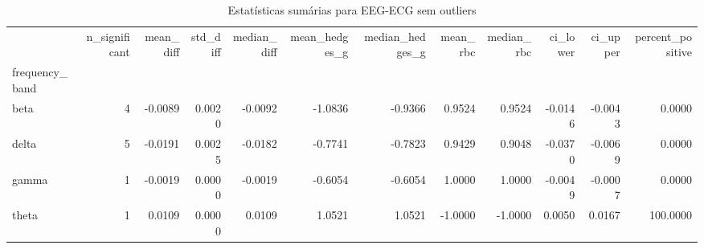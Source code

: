 \begin{table}[htbp]
\centering
\begin{tabular}{lrrrrrrrrrrr}
\toprule
 & n\_significant & mean\_diff & std\_diff & median\_diff & mean\_hedges\_g & median\_hedges\_g & mean\_rbc & median\_rbc & ci\_lower & ci\_upper & percent\_positive \\
frequency\_band &  &  &  &  &  &  &  &  &  &  &  \\
\midrule
beta & 4 & -0.0089 & 0.0020 & -0.0092 & -1.0836 & -0.9366 & 0.9524 & 0.9524 & -0.0146 & -0.0043 & 0.0000 \\
delta & 5 & -0.0191 & 0.0025 & -0.0182 & -0.7741 & -0.7823 & 0.9429 & 0.9048 & -0.0370 & -0.0069 & 0.0000 \\
gamma & 1 & -0.0019 & 0.0000 & -0.0019 & -0.6054 & -0.6054 & 1.0000 & 1.0000 & -0.0049 & -0.0007 & 0.0000 \\
theta & 1 & 0.0109 & 0.0000 & 0.0109 & 1.0521 & 1.0521 & -1.0000 & -1.0000 & 0.0050 & 0.0167 & 100.0000 \\
\bottomrule
\end{tabular}
\caption{Estatísticas sumárias para EEG-ECG sem outliers}
\label{tab:summary\_eeg\_ecg\_without}
\end{table}

